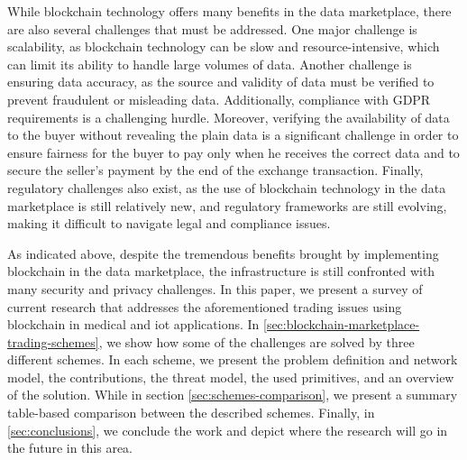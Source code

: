 While blockchain technology offers many benefits in the data marketplace, there are also several challenges that must be addressed. 
One major challenge is scalability, as blockchain technology can be slow and resource-intensive, which can limit its ability to handle large volumes of data.
Another challenge is ensuring data accuracy, as the source and validity of data must be verified to prevent fraudulent or misleading data.
Additionally, compliance with GDPR requirements is a challenging hurdle.
Moreover, verifying the availability of data to the buyer without revealing the plain data is a significant challenge in order to ensure fairness for the buyer to pay only when he receives the correct data and to secure the seller's payment by the end of the exchange transaction.
Finally, regulatory challenges also exist, as the use of blockchain technology in the data marketplace is still relatively new, and regulatory frameworks are still evolving, making it difficult to navigate legal and compliance issues.

As indicated above, despite the tremendous benefits brought by implementing blockchain in the data marketplace, the infrastructure is still confronted with many security and privacy challenges.
In this paper, we present a survey of current research that addresses the aforementioned trading issues using blockchain in medical and \ac{iot} applications.
In \cref{sec:blockchain-marketplace-trading-schemes}, we show how some of the challenges are solved by three different schemes.
In each scheme, we present the problem definition and network model, the contributions, the threat model, the used primitives, and an overview of the solution.
While in section \cref{sec:schemes-comparison}, we present a summary table-based comparison between the described schemes.
Finally, in \cref{sec:conclusions}, we conclude the work and depict where the research will go in the future in this area.
